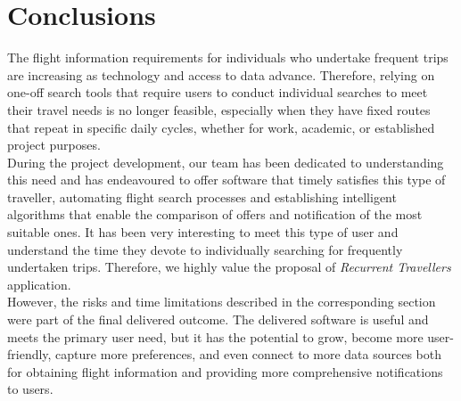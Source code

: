 \documentclass[../memory.tex]{subfiles}
\begin{document}
\chapter{Conclusions}
The flight information requirements for individuals who undertake frequent trips
are increasing as technology and access to data advance. Therefore, relying on
one-off search tools that require users to conduct individual searches to meet
their travel needs is no longer feasible, especially when they have fixed routes
that repeat in specific daily cycles, whether for work, academic, or established
project purposes.
\\[8pt]
During the project development, our team has been dedicated to understanding
this need and has endeavoured to offer software that timely satisfies this type
of traveller, automating flight search processes and establishing intelligent
algorithms that enable the comparison of offers and notification of the most
suitable ones. It has been very interesting to meet this type of user and
understand the time they devote to individually searching for frequently
undertaken trips. Therefore, we highly value the proposal of \emph{Recurrent
	Travellers} application.
\\[8pt]
However, the risks and time limitations described in the corresponding section
were part of the final delivered outcome. The delivered software is useful and
meets the primary user need, but it has the potential to grow, become more
user-friendly, capture more preferences, and even connect to more data sources
both for obtaining flight information and providing more comprehensive
notifications to users.
\end{document}
